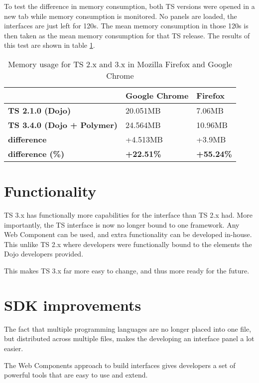 \documentclass[journal,compsoc,a4paper]{IEEEtran}
\begin{document}
To test the difference in memory consumption, both TS versions were opened in
a new tab while memory consumption is monitored. No panels are loaded, the
interfaces are just left for 120s. The mean memory consumption in those 120s is
then taken as the mean memory consumption for that TS release.
The results of this test are shown in table \ref{tbl:memoryusage}.

\begin{table}
  \begin{center}
    \begin{tabular}{| l | l | l |}
    \hline
     & Google Chrome & Firefox \\ \hline
    \textbf{TS 2.1.0 (Dojo)} & 20.051MB & 7.06MB \\ \hline
    \textbf{TS 3.4.0 (Dojo + Polymer)} & 24.564MB & 10.96MB \\ \hline
    \textbf{difference} & +4.513MB & +3.9MB \\ \hline
    \textbf{difference (\%)} & \textbf{+22.51\%} & \textbf{+55.24\%} \\ \hline
    \end{tabular}
  \end{center}
  \caption{Memory usage for TS 2.x and 3.x in Mozilla Firefox and Google Chrome}
  \label{tbl:memoryusage}
\end{table}

\section{Functionality}
TS 3.x has functionally more capabilities for the interface than TS 2.x had.
More importantly, the TS interface is now no longer bound to one framework.
Any Web Component can be used, and extra functionality can be developed in-house.
This unlike TS 2.x where developers were functionally bound to the elements the Dojo
developers provided.

This makes TS 3.x far more easy to change, and thus more ready for the future.

\section{SDK improvements}
The fact that multiple programming languages are no longer placed into one file,
but distributed across multiple files, makes the developing an interface panel
a lot easier.

The Web Components approach to build interfaces gives developers a set of
powerful tools that are easy to use and extend.
\end{document}
